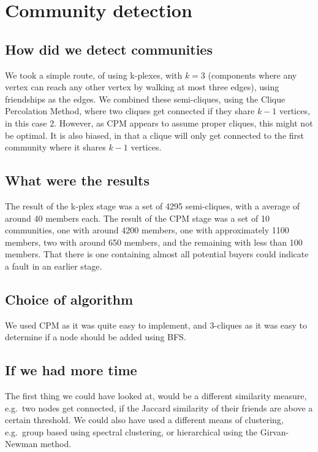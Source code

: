 \section{Community detection}

\subsection{How did we detect communities}
We took a simple route, of using k-plexes, with $k = 3$ (components where any vertex can reach any other vertex by walking at most three edges), using friendships as the edges. We combined these semi-cliques, using the Clique Percolation Method, where two cliques get connected if they share $k - 1$ vertices, in this case 2. However, as CPM appears to assume proper cliques, this might not be optimal. It is also biased, in that a clique will only get connected to the first community where it shares $k - 1$ vertices.

\subsection{What were the results}
The result of the k-plex stage was a set of 4295 semi-cliques, with a average of around 40 members each. The result of the CPM stage was a set of 10 communities, one with around 4200 members, one with approximately 1100 members, two with around 650 members, and the remaining with less than 100 members. That there is one containing almost all potential buyers could indicate a fault in an earlier stage.

\subsection{Choice of algorithm}
We used CPM as it was quite easy to implement, and 3-cliques as it was easy to determine if a node should be added using BFS.

\subsection{If we had more time}
The first thing we could have looked at, would be a different similarity measure, e.g.\ two nodes get connected, if the Jaccard similarity of their friends are above a certain threshold. We could also have used a different means of clustering, e.g.\ group based using spectral clustering, or hierarchical using the Girvan-Newman method.